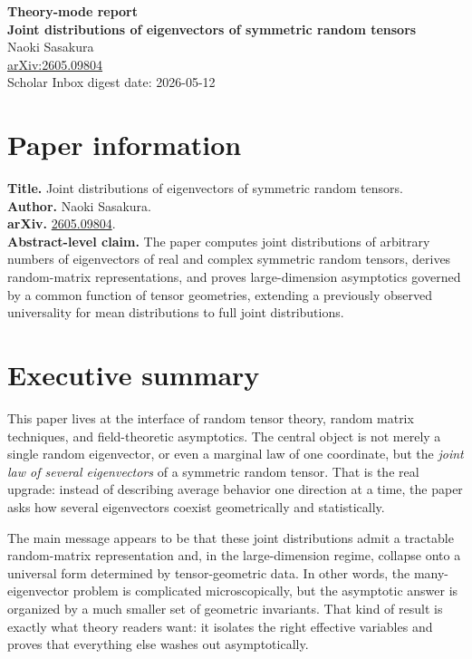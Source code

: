\documentclass[11pt]{article}
\begin{document}
\begin{center}
{\LARGE \textbf{Theory-mode report}}\\[0.4em]
{\large \textbf{Joint distributions of eigenvectors of symmetric random tensors}}\\[0.3em]
Naoki Sasakura\\
\href{https://arxiv.org/abs/2605.09804}{arXiv:2605.09804}\\
Scholar Inbox digest date: 2026-05-12
\end{center}

\section*{Paper information}
\textbf{Title.} Joint distributions of eigenvectors of symmetric random tensors.\\
\textbf{Author.} Naoki Sasakura.\\
\textbf{arXiv.} \href{https://arxiv.org/abs/2605.09804}{2605.09804}.\\
\textbf{Abstract-level claim.} The paper computes joint distributions of arbitrary numbers of eigenvectors of real and complex symmetric random tensors, derives random-matrix representations, and proves large-dimension asymptotics governed by a common function of tensor geometries, extending a previously observed universality for mean distributions to full joint distributions.

\section*{Executive summary}
This paper lives at the interface of random tensor theory, random matrix techniques, and field-theoretic asymptotics. The central object is not merely a single random eigenvector, or even a marginal law of one coordinate, but the \emph{joint law of several eigenvectors} of a symmetric random tensor. That is the real upgrade: instead of describing average behavior one direction at a time, the paper asks how several eigenvectors coexist geometrically and statistically.

The main message appears to be that these joint distributions admit a tractable random-matrix representation and, in the large-dimension regime, collapse onto a universal form determined by tensor-geometric data. In other words, the many-eigenvector problem is complicated microscopically, but the asymptotic answer is organized by a much smaller set of geometric invariants. That kind of result is exactly what theory readers want: it isolates the right effective variables and proves that everything else washes out asymptotically.
\end{document}
